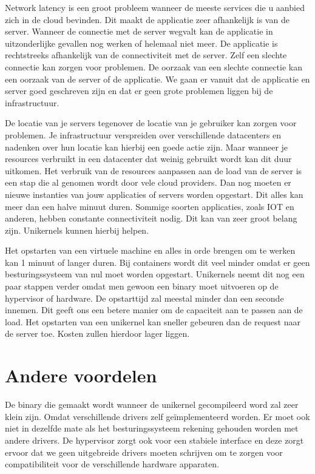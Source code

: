 \documentclass[pdftex,a4paper,12pt,twoside]{report}
\begin{document}
Network latency is een groot probleem wanneer de meeste services die u aanbied zich in de cloud bevinden. Dit maakt de applicatie zeer afhankelijk is van de server.  Wanneer de connectie met de server wegvalt kan de applicatie in uitzonderlijke gevallen nog werken of helemaal niet meer. De applicatie is rechtstreeks afhankelijk van de connectiviteit met de server. Zelf een slechte connectie kan zorgen voor problemen. De oorzaak van een slechte connectie kan een oorzaak van de server of de applicatie. We gaan er vanuit dat de applicatie en server goed geschreven zijn en dat er geen grote problemen liggen bij de infrastructuur.

De locatie van je servers tegenover de locatie van je gebruiker kan zorgen voor problemen. Je infrastructuur verspreiden over verschillende datacenters en nadenken over hun locatie kan hierbij een goede actie zijn. Maar wanneer je resources verbruikt in een datacenter dat weinig gebruikt wordt kan dit duur uitkomen. Het verbruik van de resources aanpassen aan de load van de server is een stap die al genomen wordt door vele cloud providers. Dan nog moeten er nieuwe instanties van jouw applicaties of servers worden opgestart. Dit alles kan meer dan een halve minuut duren. Sommige soorten applicaties, zoals IOT en anderen, hebben constante connectiviteit nodig. Dit kan van zeer groot belang zijn. Unikernels kunnen hierbij helpen.

Het opstarten van een virtuele machine en alles in orde brengen om te werken kan 1 minuut of langer duren. Bij containers wordt dit veel minder omdat er geen besturingssysteem van nul moet worden opgestart. Unikernels neemt dit nog een paar stappen verder omdat men gewoon een binary moet uitvoeren op de hypervisor of hardware. De opstarttijd zal meestal minder dan een seconde innemen. Dit geeft ons een betere manier om de capaciteit aan te passen aan de load. Het opstarten van een unikernel kan sneller gebeuren dan de request naar de server toe. Kosten zullen hierdoor lager liggen.

\section{Andere voordelen}

De binary die gemaakt wordt wanneer de unikernel gecompileerd word zal zeer klein zijn. Omdat verschillende drivers zelf geïmplementeerd worden. Er moet ook niet in dezelfde mate als het besturingssysteem rekening gehouden worden met andere drivers. De hypervisor zorgt ook voor een stabiele interface en deze zorgt ervoor dat we geen uitgebreide drivers moeten schrijven om te zorgen voor compatibiliteit voor de verschillende hardware apparaten.
\end{document}
